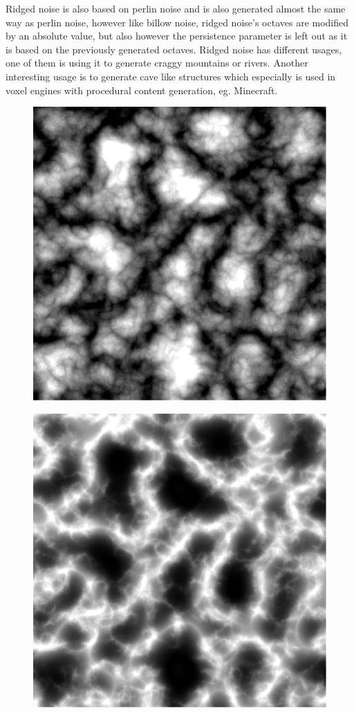 Ridged noise is also based on perlin noise and is also generated almost the same way as perlin noise, however like billow noise, ridged noise's octaves are modified by an absolute value\cite{NoiseMachineMakingNoise}, but also however the persistence parameter is left out as it is based on the previously generated octaves\cite{libnoiseRidged}. Ridged noise has different usages, one of them is using it to generate craggy mountains or rivers. Another interesting usage is to generate cave like structures which especially is used in voxel engines with procedural content generation, eg. Minecraft.

\begin{figure}[H]
	\begin{minipage}[b]{.49\linewidth}
		\includegraphics[width=0.95\linewidth]{img/Billow}
		\label{fig:4a}
	\end{minipage}
	\begin{minipage}[b]{.49\linewidth}
		\includegraphics[width=0.95\linewidth]{img/Ridged}

\end{minipage}
\end{figure}
